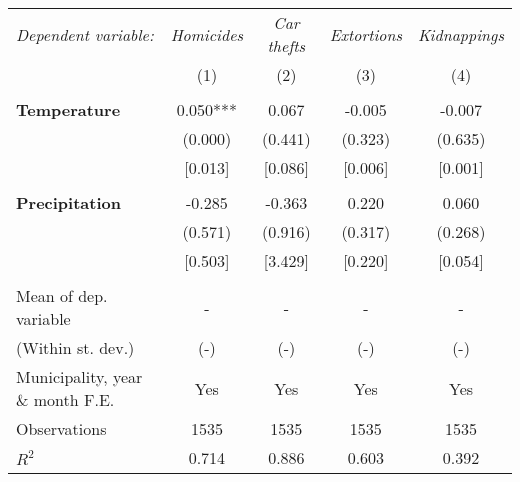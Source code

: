 \begin{tabular}{lcccc}
\hline\hline
\multicolumn{1}{l}{\textit{Dependent variable:}} &\multicolumn{1}{c}{\textit{Homicides}} &\multicolumn{1}{c}{\textit{Car thefts}} &\multicolumn{1}{c}{\textit{Extortions}} &\multicolumn{1}{c}{\textit{Kidnappings}} \\

\cmidrule(lr){2-2} \cmidrule(lr){3-3} \cmidrule(lr){4-4} \cmidrule(lr){5-5} 

&\multicolumn{1}{c}{(1)}&\multicolumn{1}{c}{(2)}&\multicolumn{1}{c}{(3)}&\multicolumn{1}{c}{(4)}\\

\\

\textbf{Temperature}
& 0.050*** & 0.067 & -0.005 & -0.007 \\
& (0.000) &  (0.441) & (0.323) & (0.635) \\
& [0.013]& [0.086] & [0.006] &	[0.001]				
\\
\\

\textbf{Precipitation} & -0.285 & -0.363 & 0.220 & 0.060 \\
& (0.571) & (0.916) & (0.317) & (0.268) \\ 
& [0.503] & [3.429] & [0.220] & [0.054]									
\\
\\

Mean of dep. variable & - & - & - & - \\
(Within st. dev.) & (-) & (-) & (-) & (-) \\ 
Municipality, year \& month F.E. & Yes & Yes & Yes & Yes \\
Observations & 1535 & 1535 & 1535 & 1535\\
$R^2$ & 0.714 & 0.886 & 0.603 & 0.392 \\
\hline\hline
\end{tabular} 